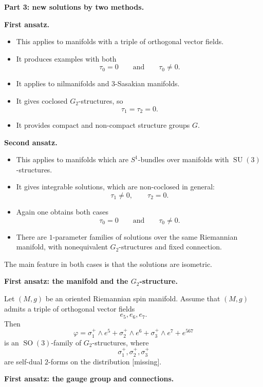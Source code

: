\medskip\noindent
{\bf Part 3: new solutions by two
methods.}

\medskip\noindent
{\bf First ansatz.}

\begin{itemize}
\item This applies to manifolds with a
triple of orthogonal vector fields.
\item It produces examples with both
\[
        \tau_0=0
        \qquad\text{and}\qquad
        \tau_0\neq 0.
\]
\item It applies to nilmanifolds and
$3$-Sasakian manifolds.
\item It gives coclosed
$G_2$-structures, so
\[
        \tau_1=\tau_2=0.
\]
\item It provides compact and
non-compact structure groups $G$.
\end{itemize}

\medskip\noindent
{\bf Second ansatz.}

\begin{itemize}
\item This applies to manifolds which
are $S^1$-bundles over manifolds with
$\operatorname{SU}(3)$-structures.
\item It gives integrable solutions,
which are non-coclosed in general:
\[
        \tau_1\neq 0,
        \qquad
        \tau_2=0.
\]
\item Again one obtains both cases
\[
        \tau_0=0
        \qquad\text{and}\qquad
        \tau_0\neq 0.
\]
\item There are $1$-parameter families
of solutions over the same Riemannian
manifold, with nonequivalent
$G_2$-structures and fixed connection.
\end{itemize}

The main feature in both cases is that
the solutions are isometric.

\medskip\noindent
{\bf First ansatz: the manifold and
the $G_2$-structure.}

Let $(M,g)$ be an oriented Riemannian
spin manifold.
Assume that $(M,g)$ admits a triple of
orthogonal vector fields
\[
        e_5,e_6,e_7.
\]
Then
\[
        \varphi
        =
        \sigma^+_1\wedge e^5
        +
        \sigma^+_2\wedge e^6
        +
        \sigma^+_3\wedge e^7
        +
        e^{567}
\]
is an $\operatorname{SO}(3)$-family
of $G_2$-structures, where
\[
        \sigma^+_1,\sigma^+_2,
        \sigma^+_3
\]
are self-dual $2$-forms on the
distribution [missing].

\medskip\noindent
{\bf First ansatz: the gauge group and
connections.}

